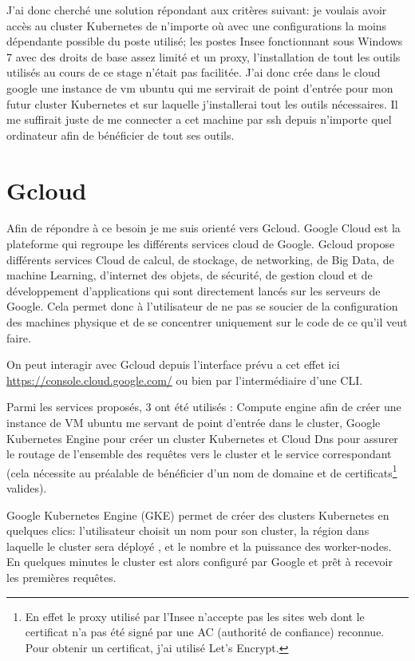 \documentclass[11pt,fleqn]{book} %
\begin{document}
J'ai donc cherché une solution répondant aux critères suivant: je voulais avoir accès au cluster Kubernetes de n'importe où avec une configurations la moins dépendante possible du poste utilisé; les postes Insee fonctionnant sous Windows 7 avec des droits de base assez limité et un proxy, l'installation de tout les outils utilisés au cours de ce stage n'était pas facilitée. J'ai donc crée dans le cloud google une instance de vm ubuntu qui me servirait de point d'entrée pour mon futur cluster Kubernetes et sur laquelle j'installerai tout les outils nécessaires. Il me suffirait juste de me connecter a cet machine par ssh depuis n'importe quel ordinateur afin de bénéficier de tout ses outils.\newline


\section*{Gcloud}
Afin de répondre à ce besoin je me suis orienté vers Gcloud. Google Cloud est la plateforme qui regroupe les différents services cloud de Google. Gcloud propose différents services Cloud de calcul, de stockage, de networking, de Big Data, de machine Learning, d’internet des objets, de sécurité, de gestion cloud et de développement d’applications qui sont directement lancés sur les serveurs de Google. Cela permet donc à l'utilisateur de ne pas se soucier de la configuration des machines physique et de se concentrer uniquement sur le code de ce qu'il veut faire.\newline

On peut interagir avec Gcloud depuis l'interface prévu a cet effet ici \url{https://console.cloud.google.com/} ou bien par l'intermédiaire d'une CLI.\newline

Parmi les services proposés, 3 ont été utilisés : Compute engine afin de créer une instance de VM ubuntu me servant de point d'entrée dans le cluster, Google Kubernetes Engine pour créer un cluster Kubernetes et Cloud Dns pour assurer le routage de l'ensemble des requêtes vers le cluster et le service correspondant (cela nécessite au préalable de bénéficier d'un nom de domaine et de certificats\footnote{En effet le proxy utilisé par l'Insee n'accepte pas les sites web dont le certificat n'a pas été signé par une AC (authorité de confiance) reconnue. Pour obtenir un certificat, j'ai utilisé Let's Encrypt.} valides).\newline

Google Kubernetes Engine (GKE) permet de créer des clusters Kubernetes en quelques clics: l'utilisateur choisit un nom pour son cluster, la région dans laquelle le cluster sera déployé , et le nombre et la puissance des worker-nodes. En quelques minutes le cluster est alors configuré par Google et prêt à recevoir les premières requêtes.\newline
\end{document}
